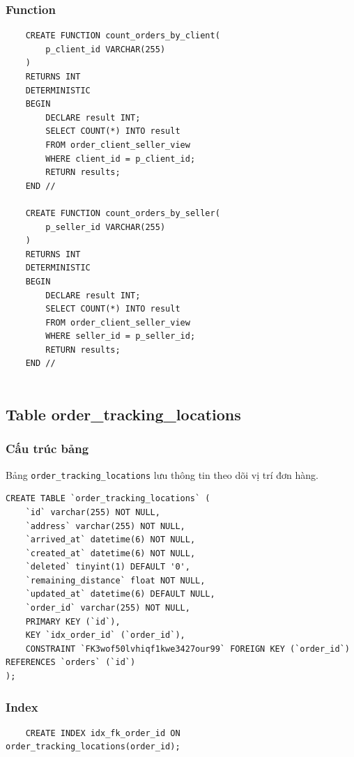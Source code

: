 \subsubsection{Function}

\begin{verbatim}
    CREATE FUNCTION count_orders_by_client(
        p_client_id VARCHAR(255)
    )
    RETURNS INT
    DETERMINISTIC
    BEGIN
        DECLARE result INT;
        SELECT COUNT(*) INTO result
        FROM order_client_seller_view
        WHERE client_id = p_client_id;
        RETURN results;
    END //

    CREATE FUNCTION count_orders_by_seller(
        p_seller_id VARCHAR(255)
    )
    RETURNS INT
    DETERMINISTIC
    BEGIN
        DECLARE result INT;
        SELECT COUNT(*) INTO result
        FROM order_client_seller_view
        WHERE seller_id = p_seller_id;
        RETURN results;
    END //


\end{verbatim}

\subsection{Table order\_tracking\_locations}

\subsubsection{Cấu trúc bảng}

Bảng \texttt{order\_tracking\_locations} lưu thông tin theo dõi vị trí đơn hàng.

\begin{verbatim}
CREATE TABLE `order_tracking_locations` (
    `id` varchar(255) NOT NULL,
    `address` varchar(255) NOT NULL,
    `arrived_at` datetime(6) NOT NULL,
    `created_at` datetime(6) NOT NULL,
    `deleted` tinyint(1) DEFAULT '0',
    `remaining_distance` float NOT NULL,
    `updated_at` datetime(6) DEFAULT NULL,
    `order_id` varchar(255) NOT NULL,
    PRIMARY KEY (`id`),
    KEY `idx_order_id` (`order_id`),
    CONSTRAINT `FK3wof50lvhiqf1kwe3427our99` FOREIGN KEY (`order_id`) REFERENCES `orders` (`id`)
);
\end{verbatim}

\subsubsection{Index}

\begin{verbatim}
    CREATE INDEX idx_fk_order_id ON order_tracking_locations(order_id);
\end{verbatim}


